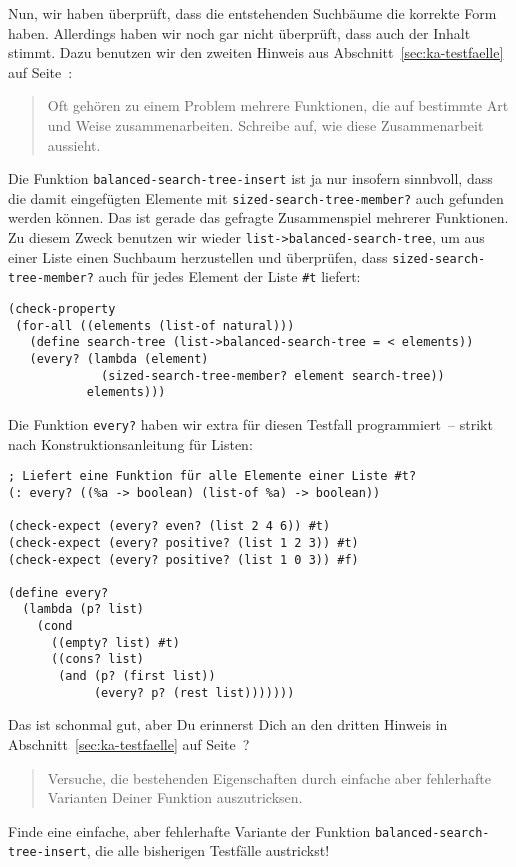 Nun, wir haben überprüft, dass die entstehenden Suchbäume die korrekte
Form haben.  Allerdings haben wir noch gar nicht überprüft, dass auch
der Inhalt stimmt.  Dazu benutzen wir den zweiten Hinweis aus
Abschnitt~\ref{sec:ka-testfaelle} auf
Seite~\pageref{sec:ka-testfaelle}:
%
\begin{quote}
  Oft gehören zu einem Problem mehrere Funktionen, die auf bestimmte
  Art und Weise zusammenarbeiten.  Schreibe auf, wie diese
  Zusammenarbeit aussieht.
\end{quote}
%
Die Funktion \lstinline{balanced-search-tree-insert} ist ja nur
insofern sinnbvoll, dass die damit eingefügten Elemente mit
\lstinline{sized-search-tree-member?} auch gefunden werden können. Das
ist gerade das gefragte Zusammenspiel mehrerer Funktionen.  Zu diesem
Zweck benutzen wir wieder \lstinline{list->balanced-search-tree}, um
aus einer Liste einen Suchbaum herzustellen und überprüfen, dass
\lstinline{sized-search-tree-member?} auch für jedes Element der Liste
\lstinline{#t} liefert:
%
\begin{lstlisting}
(check-property
 (for-all ((elements (list-of natural)))
   (define search-tree (list->balanced-search-tree = < elements))
   (every? (lambda (element)
             (sized-search-tree-member? element search-tree))
           elements)))
\end{lstlisting}
%
Die Funktion \lstinline{every?} haben wir extra für diesen Testfall
programmiert~-- strikt nach Konstruktionsanleitung für Listen:
%
\begin{lstlisting}
; Liefert eine Funktion für alle Elemente einer Liste #t?
(: every? ((%a -> boolean) (list-of %a) -> boolean))

(check-expect (every? even? (list 2 4 6)) #t)
(check-expect (every? positive? (list 1 2 3)) #t)
(check-expect (every? positive? (list 1 0 3)) #f)

(define every?
  (lambda (p? list)
    (cond
      ((empty? list) #t)
      ((cons? list)
       (and (p? (first list))
            (every? p? (rest list)))))))
\end{lstlisting}
%
Das ist schonmal gut, aber Du erinnerst Dich an den dritten Hinweis in
Abschnitt~\ref{sec:ka-testfaelle} auf
Seite~\pageref{sec:ka-testfaelle}?
%
\begin{quote}
  Versuche, die bestehenden Eigenschaften durch einfache aber
  fehlerhafte Varianten Deiner Funktion auszutricksen.
\end{quote}
%
\begin{aufgabeinline}
  Finde eine einfache, aber fehlerhafte Variante der Funktion
  \lstinline{balanced-search-tree-insert}, die alle bisherigen
  Testfälle austrickst!
\end{aufgabeinline}
